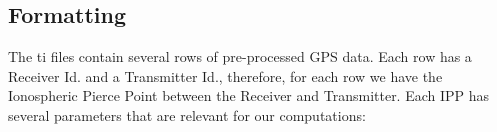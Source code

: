 
\subsection{Formatting}

The ti files contain several rows of pre-processed GPS data. Each row has a Receiver Id. and a Transmitter Id., therefore, for each row we have the Ionospheric Pierce Point between the Receiver and Transmitter. Each IPP has several parameters that are relevant for our computations:

